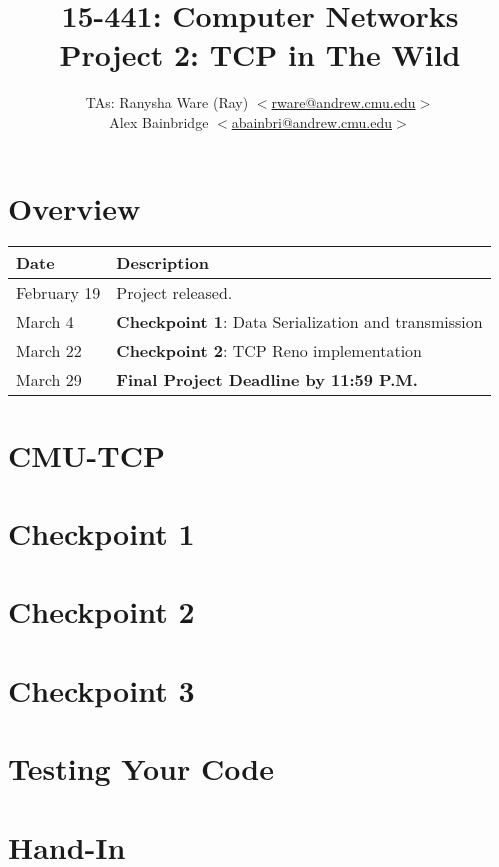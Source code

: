 \documentclass[10pt,letterpaper]{article}
\title{ 15-441: Computer Networks\\ Project 2: TCP in The Wild\\ }
\author{TAs: Ranysha Ware (Ray)
             $<$\href{mailto:rware@andrew.cmu.edu }{rware@andrew.cmu.edu}$>$ \\
              Alex Bainbridge
             $<$\href{mailto:abainbri@andrew.cmu.edu}{abainbri@andrew.cmu.edu}$>$}
\date{}
\newcommand{\jc}[1]{{#1}}
\begin{document}
\maketitle

\section{Overview} 


\begin{table}[h]
\begin{center}
\begin{tabular}{l|l}
 \textbf{Date} & \textbf{Description} \\ \hline February 19 & Project
 released. \\ \jc{March 4} &
 \textbf{Checkpoint 1}: Data Serialization and transmission
 \\ \jc{March 22} &
 \textbf{Checkpoint 2}: TCP Reno implementation
 \\ \jc{March 29} & \textbf{Final Project Deadline by 11:59 P.M.} \\
\end{tabular}
\end{center}
\label{tab:duedate}
\end{table}



\section{CMU-TCP}


\section{Checkpoint 1}

\section{Checkpoint 2}


\section{Checkpoint 3}
 

\section{Testing Your Code}

\section{Hand-In}
\label{sec:handin}




\end{document}

